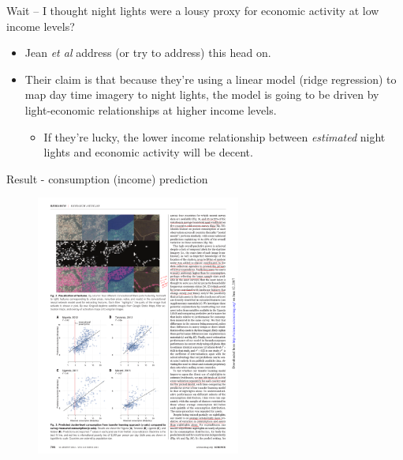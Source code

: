 \documentclass[mathserif]{beamer}
\begin{document}
\begin{frame}{Wait -- I thought night lights were a lousy proxy for economic activity at low income levels?}

\begin{itemize}
\item Jean \textit{et al} address (or try to address) this head on.  
\item Their claim is that because they're using a linear model (ridge regression) to map day time imagery to  night lights, the model is going to be driven by light-economic relationships at higher income levels.  
\begin{itemize}
 \item If they're lucky, the lower income relationship between \textit{estimated} night lights and economic activity will be decent.
 \end{itemize} 
\end{itemize}
\end{frame}

\begin{frame}{Result - consumption (income) prediction}

\begin{figure}
\includegraphics[width=0.6\textwidth]{jean_fig3}
\caption*{}
\end{figure}
\end{frame}
\end{document}
